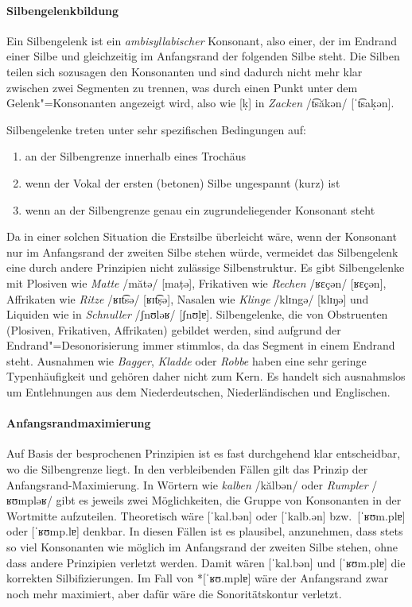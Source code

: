 \paragraph*{Silbengelenkbildung}

Ein Silbengelenk ist ein \textit{ambisyllabischer} Konsonant, also einer, der im Endrand einer Silbe und gleichzeitig im Anfangsrand der folgenden Silbe steht.
Die Silben teilen sich sozusagen den Konsonanten und sind dadurch nicht mehr klar zwischen zwei Segmenten zu trennen, was durch einen Punkt unter dem Gelenk"=Konsonanten angezeigt wird, also wie [ḳ] in \textit{Zacken} /t͡săkən/ [ˈt͡saḳən].

Silbengelenke treten unter sehr spezifischen Bedingungen auf:

\begin{enumerate}
  \item an der Silbengrenze innerhalb eines Trochäus
  \item wenn der Vokal der ersten (betonen) Silbe ungespannt (kurz) ist
  \item wenn an der Silbengrenze genau ein zugrundeliegender Konsonant steht
\end{enumerate}

Da in einer solchen Situation die Erstsilbe überleicht wäre, wenn der Konsonant nur im Anfangsrand der zweiten Silbe stehen würde, vermeidet das Silbengelenk eine durch andere Prinzipien nicht zulässige Silbenstruktur.
Es gibt Silbengelenke mit Plosiven wie \textit{Matte} /mătə/ [maṭə], Frikativen wie \textit{Rechen} /ʁɛçən/ [ʁɛç̣ən], Affrikaten wie \textit{Ritze} /ʁɪt͡sə/ [ʁɪt͡ṣə], Nasalen wie \textit{Klinge} /klɪngə/ [klɪŋ̣ə] und Liquiden wie in \textit{Schnuller} /ʃnʊləʁ/ [ʃnʊḷɐ].
Silbengelenke, die von Obstruenten (Plosiven, Frikativen, Affrikaten) gebildet werden, sind aufgrund der Endrand"=Desonorisierung immer stimmlos, da das Segment in einem Endrand steht.
Ausnahmen wie \textit{Bagger}, \textit{Kladde} oder \textit{Robbe} haben eine sehr geringe Typenhäufigkeit und gehören daher nicht zum Kern.
Es handelt sich ausnahmslos um Entlehnungen aus dem Niederdeutschen, Niederländischen und Englischen.

\paragraph*{Anfangsrandmaximierung}

Auf Basis der besprochenen Prinzipien ist es fast durchgehend klar entscheidbar, wo die Silbengrenze liegt.
In den verbleibenden Fällen gilt das Prinzip der Anfangsrand-Maximierung.
In Wörtern wie \textit{kalben} /kălbən/ oder \textit{Rumpler} /ʁʊmpləʁ/ gibt es jeweils zwei Möglichkeiten, die Gruppe von Konsonanten in der Wortmitte aufzuteilen.
Theoretisch wäre [ˈkal.bən] oder [ˈkalb.ən] bzw.\ [ˈʁʊm.plɐ] oder [ˈʁʊmp.lɐ] denkbar.
In diesen Fällen ist es plausibel, anzunehmen, dass stets so viel Konsonanten wie möglich im Anfangsrand der zweiten Silbe stehen, ohne dass andere Prinzipien verletzt werden.
Damit wären [ˈkal.bən] und [ˈʁʊm.plɐ] die korrekten Silbifizierungen.
Im Fall von *[ˈʁʊ.mplɐ] wäre der Anfangsrand zwar noch mehr maximiert, aber dafür wäre die Sonoritätskontur verletzt.


